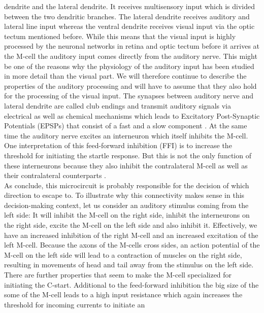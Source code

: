 \documentclass[a4paper,10pt,hidelinks]{scrreprt}
\begin{document}
	dendrite and the lateral dendrite.
	It receives multisensory input which is divided between the two dendritic branches.
	The lateral dendrite receives auditory and lateral line input whereas the ventral dendrite 
	receives visual input via the optic tectum mentioned before.
	While this means that the visual input is highly processed by the neuronal networks in retina and optic 
	tectum before it arrives at the M-cell the auditory input comes directly from the auditory 
	nerve.
	This might be one of the reasons why the physiology of the auditory input has been studied in 
	more detail than the visual part.
	We will therefore continue to describe the properties of the auditory processing and will have 
	to assume that they also hold for the processing of the visual input.
	The synapses between auditory nerve and lateral dendrite are called club endings and transmit 
	auditory signals via electrical as well as chemical mechanisms which leads to Excitatory 
	Post-Synaptic Potentials (EPSPs) that consist of a fast and a slow component \citep{Korn2005}.
	At the same time the auditory nerve excites an interneuron which itself inhibits the M-cell.
	One interpretation of this feed-forward inhibition (FFI) is to increase the threshold for 
	initiating the startle response.
	But this is not the only function of these interneurons because they also inhibit the 
	contralateral M-cell as well as their contralateral counterparts \citep{Koyama2016}.\\
	As \cite{Koyama2016} conclude, this microcircuit is probably responsible for the decision of which direction to escape to.
	To illustrate why this connectivity makes sense in this decision-making context, let us 
	consider an auditory stimulus coming from the left side:
	It will inhibit the M-cell on the right side, inhibit the interneurons on the right side, excite the M-cell on the left side and also inhibit it.
	Effectively, we have an increased inhibition of the right M-cell and an increased excitation of the left M-cell.
	Because the axons of the M-cells cross sides, an action potential of the M-cell on the left 
	side will lead to a contraction of muscles on the right side, resulting in movements of head 
	and tail away from the stimulus on the left side.\\
	There are further properties that seem to make the M-cell specialized for initiating the 
	C-start.
	Additional to the feed-forward inhibition the big size of the some of the M-cell leads to a 
	high input resistance which again increases the threshold for incoming currents to initiate an 
\end{document}

